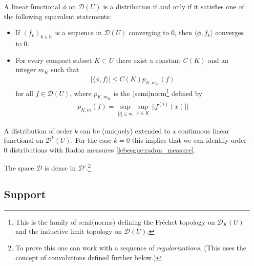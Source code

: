 	\begin{property}
		A linear functional $\phi$ on $\mathcal{D}(U)$ is a distribution if and only if it satisfies one of the following equivalent statements:
		\begin{itemize}
			\item If $(f_k)_{k\in\mathbb{N}}$ is a sequence in $\mathcal{D}(U)$ converging to 0, then $\langle\phi,f_k\rangle$ converges to 0.
			\item For every compact subset $K\subset U$ there exist a constant $C(K)$ and an integer $m_K$ such that
			\begin{gather}
				|\langle\phi,f\rangle|\leq C(K)p_{K, m_K}(f)
			\end{gather}
			for all $f\in\mathcal{D}(U)$, where $p_{K, m_K}$ is the (semi)norm\footnote{This is the family of semi(norms) defining the Fr\'echet topology on $\mathcal{D}_K(U)$ and the inductive limit topology on $\mathcal{D}(U)$.} defined by
			\begin{gather}
                \label{distribution:D_seminorm}
				p_{K, m}(f) = \sup_{|i|\leq m}\sup_{x\in K}||f^{(i)}(x)||
			\end{gather}
		\end{itemize}
	\end{property}


	\begin{property}
		A distribution of order $k$ can be (uniquely) extended to a continuous linear functional on $\mathcal{D}^k(U)$. For the case $k=0$ this implies that we can identify order-0 distributions with Radon measures \ref{lebesgue:radon_measure}.
	\end{property}

    \begin{property}
        The space $\mathcal{D}$ is dense in $\mathcal{D}'$.\footnote{To prove this one can work with a sequence of \textit{regularizations}. (This uses the concept of convolutions defined further below.)}
    \end{property}

\subsection{Support}

